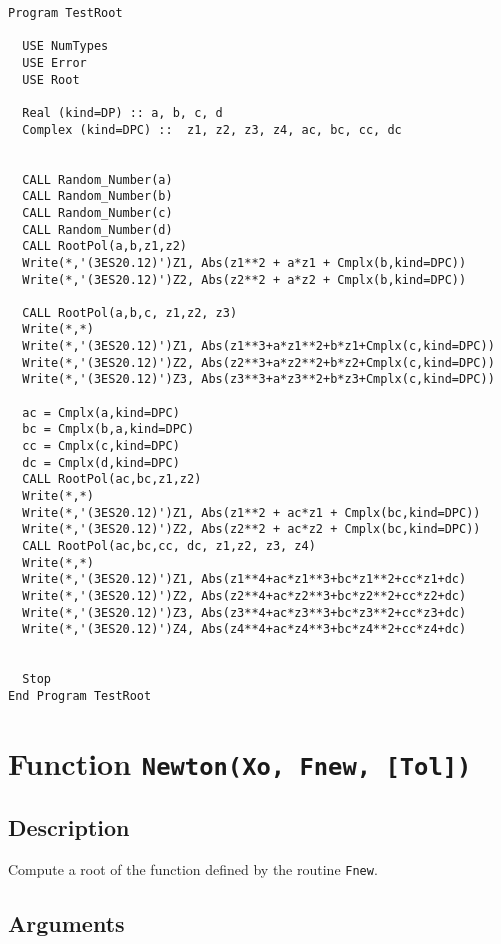 \begin{verbatim}
Program TestRoot

  USE NumTypes
  USE Error
  USE Root

  Real (kind=DP) :: a, b, c, d
  Complex (kind=DPC) ::  z1, z2, z3, z4, ac, bc, cc, dc


  CALL Random_Number(a)
  CALL Random_Number(b)
  CALL Random_Number(c)
  CALL Random_Number(d)
  CALL RootPol(a,b,z1,z2)
  Write(*,'(3ES20.12)')Z1, Abs(z1**2 + a*z1 + Cmplx(b,kind=DPC))
  Write(*,'(3ES20.12)')Z2, Abs(z2**2 + a*z2 + Cmplx(b,kind=DPC))

  CALL RootPol(a,b,c, z1,z2, z3)
  Write(*,*)
  Write(*,'(3ES20.12)')Z1, Abs(z1**3+a*z1**2+b*z1+Cmplx(c,kind=DPC))
  Write(*,'(3ES20.12)')Z2, Abs(z2**3+a*z2**2+b*z2+Cmplx(c,kind=DPC))
  Write(*,'(3ES20.12)')Z3, Abs(z3**3+a*z3**2+b*z3+Cmplx(c,kind=DPC))

  ac = Cmplx(a,kind=DPC)
  bc = Cmplx(b,a,kind=DPC)
  cc = Cmplx(c,kind=DPC)
  dc = Cmplx(d,kind=DPC)
  CALL RootPol(ac,bc,z1,z2)
  Write(*,*)
  Write(*,'(3ES20.12)')Z1, Abs(z1**2 + ac*z1 + Cmplx(bc,kind=DPC))
  Write(*,'(3ES20.12)')Z2, Abs(z2**2 + ac*z2 + Cmplx(bc,kind=DPC))
  CALL RootPol(ac,bc,cc, dc, z1,z2, z3, z4)
  Write(*,*)
  Write(*,'(3ES20.12)')Z1, Abs(z1**4+ac*z1**3+bc*z1**2+cc*z1+dc)
  Write(*,'(3ES20.12)')Z2, Abs(z2**4+ac*z2**3+bc*z2**2+cc*z2+dc)
  Write(*,'(3ES20.12)')Z3, Abs(z3**4+ac*z3**3+bc*z3**2+cc*z3+dc)
  Write(*,'(3ES20.12)')Z4, Abs(z4**4+ac*z4**3+bc*z4**2+cc*z4+dc)


  Stop
End Program TestRoot
\end{verbatim}


\section{Function \texttt{Newton(Xo,  Fnew,  [Tol]) }}

\subsection{Description}

Compute a root of the function defined by the routine \texttt{Fnew}.

\subsection{Arguments}

